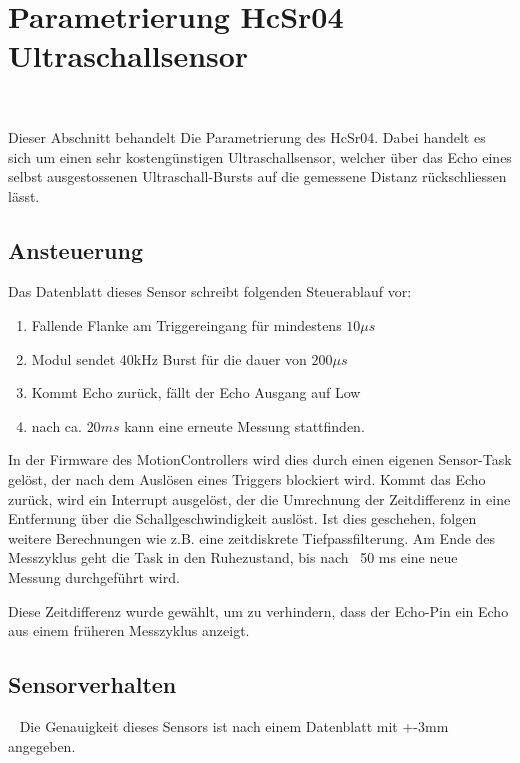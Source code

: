 \documentclass[main.tex]{subfiles} %
\begin{document}

\section{Parametrierung HcSr04 Ultraschallsensor}~\label{apdx:FilterDimensionierungHcSr04}

Dieser Abschnitt behandelt Die Parametrierung des HcSr04. Dabei handelt es sich
um einen sehr kostengünstigen Ultraschallsensor, welcher über das Echo eines
selbst ausgestossenen Ultraschall-Bursts auf die gemessene Distanz
rückschliessen lässt.

\subsection*{Ansteuerung}

Das Datenblatt dieses Sensor schreibt folgenden Steuerablauf vor:

\begin{enumerate}
    \item Fallende Flanke am Triggereingang für mindestens $10 \mu s$
    \item Modul sendet 40kHz Burst für die dauer von $200 \mu s$
    \item Kommt Echo zurück, fällt der Echo Ausgang auf Low
    \item nach ca. $20 ms$ kann eine erneute Messung stattfinden.
\end{enumerate}

In der Firmware des MotionControllers wird dies durch einen eigenen Sensor-Task
gelöst, der nach dem Auslösen eines Triggers blockiert wird. Kommt das Echo
zurück, wird ein Interrupt ausgelöst, der die Umrechnung der Zeitdifferenz in
eine Entfernung über die Schallgeschwindigkeit auslöst. Ist dies geschehen,
folgen weitere Berechnungen wie z.B. eine zeitdiskrete Tiefpassfilterung. Am
Ende des Messzyklus geht die Task in den Ruhezustand, bis nach ~50 ms eine neue
Messung durchgeführt wird.

Diese Zeitdifferenz wurde gewählt, um zu verhindern, dass der Echo-Pin ein Echo
aus einem früheren Messzyklus anzeigt.

\subsection*{Sensorverhalten}~\label{apdx:Sensorverhalten}
Die Genauigkeit dieses Sensors ist nach einem Datenblatt mit +-3mm angegeben.
\end{document}
